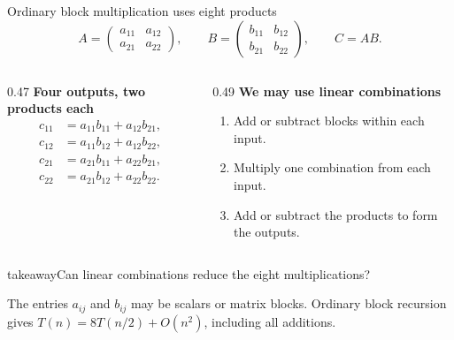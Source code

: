 \documentclass[aspectratio=169,11pt]{beamer}
\newcommand{\source}[1]{\vfill\par{\fontsize{7.5}{9}\selectfont\color{muted}#1\par}}
\newcommand{\takeaway}[1]{\begin{beamercolorbox}[sep=0.65em,wd=\linewidth]{takeaway}#1\end{beamercolorbox}}
\begin{document}
\begin{frame}{Ordinary block multiplication uses eight products}
  \[
    A=\begin{pmatrix}a_{11}&a_{12}\\a_{21}&a_{22}\end{pmatrix},\qquad
    B=\begin{pmatrix}b_{11}&b_{12}\\b_{21}&b_{22}\end{pmatrix},\qquad C=AB.
  \]
  \begin{columns}[T,onlytextwidth]
    \begin{column}{0.47\textwidth}
      \textbf{Four outputs, two products each}
      \[
      \begin{aligned}
        c_{11}&=a_{11}b_{11}+a_{12}b_{21},\\
        c_{12}&=a_{11}b_{12}+a_{12}b_{22},\\
        c_{21}&=a_{21}b_{11}+a_{22}b_{21},\\
        c_{22}&=a_{21}b_{12}+a_{22}b_{22}.
      \end{aligned}
      \]
    \end{column}
    \begin{column}{0.49\textwidth}
      \textbf{We may use linear combinations}
      \begin{enumerate}
        \item Add or subtract blocks within each input.
        \item Multiply one combination from each input.
        \item Add or subtract the products to form the outputs.
      \end{enumerate}
    \end{column}
  \end{columns}
  \medskip
  \takeaway{Can linear combinations reduce the eight multiplications?}
  \source{The entries $a_{ij}$ and $b_{ij}$ may be scalars or matrix blocks.
  Ordinary block recursion gives $T(n)=8T(n/2)+O(n^2)$, including all additions.}
\end{frame}
\end{document}
